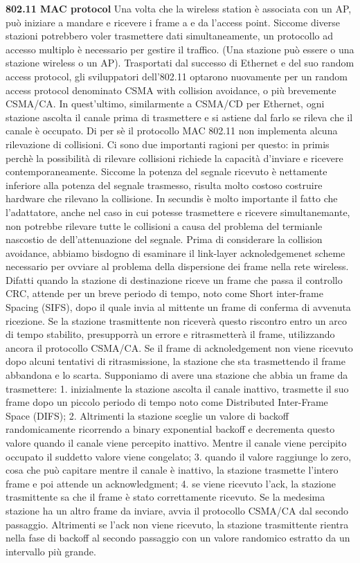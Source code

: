 \documentclass[a4paper,10pt]{article} %
\renewcommand{\b}[1]{%
    {\textbf{#1}}}
\begin{document}
\b{802.11 MAC protocol} Una volta che la wireless station è associata con un AP, può iniziare a mandare e ricevere i frame a e da l'access point. Siccome diverse stazioni potrebbero voler trasmettere dati simultaneamente, un protocollo ad accesso multiplo è necessario per gestire il traffico. (Una stazione può essere o una stazione wireless o un AP). Trasportati dal successo di Ethernet e del suo random access protocol, gli sviluppatori dell'802.11 optarono nuovamente per un random access protocol denominato CSMA with collision avoidance, o più brevemente CSMA/CA. In quest'ultimo, similarmente a CSMA/CD per Ethernet, ogni stazione ascolta il canale prima di trasmettere e si astiene dal farlo se rileva che il canale è occupato. Di per sè il protocollo MAC 802.11 non implementa alcuna rilevazione di collisioni. Ci sono due importanti ragioni per questo: in primis perchè la possibilità di rilevare collisioni richiede la capacità d'inviare e ricevere contemporaneamente. Siccome la potenza del segnale ricevuto è nettamente inferiore alla potenza del segnale trasmesso, risulta molto costoso costruire hardware che rilevano la collisione. In secundis è molto importante il fatto che l'adattatore, anche nel caso in cui potesse trasmettere e ricevere simultanemante, non potrebbe rilevare tutte le collisioni a causa del problema del termianle nascostio de dell'attenuazione del segnale. Prima di considerare la collision avoidance, abbiamo bisdogno di esaminare il link-layer acknoledgemenet scheme necessario per ovviare al problema della dispersione dei frame nella rete wireless. Difatti quando la stazione di destinazione riceve un frame che passa il controllo CRC, attende per un breve periodo di tempo, noto come Short inter-frame Spacing (SIFS), dopo il quale invia al mittente un frame di conferma di avvenuta ricezione. Se la stazione trasmittente non riceverà questo riscontro entro un arco di tempo stabilito, presupporrà un errore e ritrasmetterà il frame, utilizzando ancora il protocollo CSMA/CA. Se il frame di acknoledgement non viene ricevuto dopo alcuni tentativi di ritrasmissione, la stazione che sta trasmettendo il frame abbandona e lo scarta. Supponiamo di avere una stazione che abbia un frame da trasmettere: 1. inizialmente la stazione ascolta il canale inattivo, trasmette il suo frame dopo un piccolo periodo di tempo noto come Distributed Inter-Frame Space (DIFS); 2. Altrimenti la stazione sceglie un valore di backoff randomicamente ricorrendo a binary exponential backoff e decrementa questo valore quando il canale viene percepito inattivo. Mentre il canale viene percipito occupato il suddetto valore viene congelato; 3. quando il valore raggiunge lo zero, cosa che può capitare mentre il canale è inattivo, la stazione trasmette l'intero frame e poi attende un acknowledgment; 4. se viene ricevuto l'ack, la stazione trasmittente sa che il frame è stato correttamente ricevuto. Se la medesima stazione ha un altro frame da inviare, avvia il protocollo CSMA/CA dal secondo passaggio. Altrimenti se l'ack non viene ricevuto, la stazione trasmittente rientra nella fase di backoff al secondo passaggio con un valore randomico estratto da un intervallo più grande.
\end{document}
